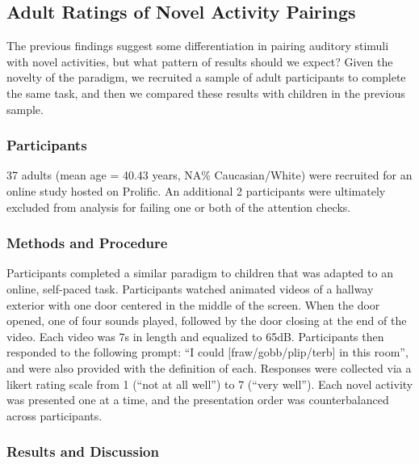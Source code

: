\documentclass[10pt, letterpaper]{article}
\begin{document}
\hypertarget{adult-ratings-of-novel-activity-pairings}{%
\subsection{Adult Ratings of Novel Activity
Pairings}\label{adult-ratings-of-novel-activity-pairings}}

The previous findings suggest some differentiation in pairing auditory
stimuli with novel activities, but what pattern of results should we
expect? Given the novelty of the paradigm, we recruited a sample of
adult participants to complete the same task, and then we compared these
results with children in the previous sample.

\hypertarget{participants-2}{%
\subsubsection{Participants}\label{participants-2}}

37 adults (mean age = 40.43 years, NA\% Caucasian/White) were recruited
for an online study hosted on Prolific. An additional 2 participants
were ultimately excluded from analysis for failing one or both of the
attention checks.

\hypertarget{methods-and-procedure}{%
\subsubsection{Methods and Procedure}\label{methods-and-procedure}}

Participants completed a similar paradigm to children that was adapted
to an online, self-paced task. Participants watched animated videos of a
hallway exterior with one door centered in the middle of the screen.
When the door opened, one of four sounds played, followed by the door
closing at the end of the video. Each video was 7s in length and
equalized to 65dB. Participants then responded to the following prompt:
``I could {[}fraw/gobb/plip/terb{]} in this room'', and were also
provided with the definition of each. Responses were collected via a
likert rating scale from 1 (``not at all well'') to 7 (``very well'').
Each novel activity was presented one at a time, and the presentation
order was counterbalanced across participants.

\hypertarget{results-and-discussion-2}{%
\subsubsection{Results and Discussion}\label{results-and-discussion-2}}
\end{document}
